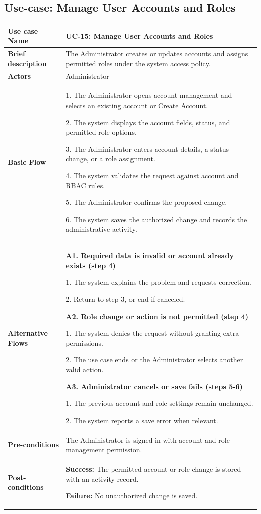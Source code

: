 
\clearpage
\subsection{Use-case: Manage User Accounts and Roles}
\label{uc:uc-15}
\begin{longtable}{|p{}|p{}|}
\hline
\textbf{Use case Name} & UC-15: Manage User Accounts and Roles \\ \hline
\textbf{Brief description} & The Administrator creates or updates accounts and assigns permitted roles under the system access policy. \\ \hline
\textbf{Actors} & Administrator \\ \hline
\textbf{Basic Flow} &
1. The Administrator opens account management and selects an existing account or Create Account.\par
2. The system displays the account fields, status, and permitted role options.\par
3. The Administrator enters account details, a status change, or a role assignment.\par
4. The system validates the request against account and RBAC rules.\par
5. The Administrator confirms the proposed change.\par
6. The system saves the authorized change and records the administrative activity.
\\ \hline
\textbf{Alternative Flows} &
\textbf{A1. Required data is invalid or account already exists (step 4)}\par
1. The system explains the problem and requests correction.\par
2. Return to step 3, or end if canceled.
\par\smallskip
\textbf{A2. Role change or action is not permitted (step 4)}\par
1. The system denies the request without granting extra permissions.\par
2. The use case ends or the Administrator selects another valid action.
\par\smallskip
\textbf{A3. Administrator cancels or save fails (steps 5-6)}\par
1. The previous account and role settings remain unchanged.\par
2. The system reports a save error when relevant.
\\ \hline
\textbf{Pre-conditions} & The Administrator is signed in with account and role-management permission. \\ \hline
\textbf{Post-conditions} & \textbf{Success:} The permitted account or role change is stored with an activity record.\par
\textbf{Failure:} No unauthorized change is saved. \\ \hline
\end{longtable}

